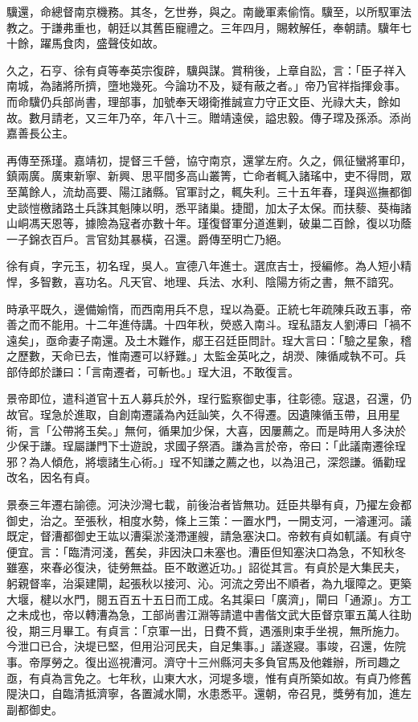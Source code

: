 \begin{pinyinscope}
驥還，命總督南京機務。其冬，乞世券，與之。南畿軍素偷惰。驥至，以所馭軍法教之。于謙弗重也，朝廷以其舊臣寵禮之。三年四月，賜敕解任，奉朝請。驥年七十餘，躍馬食肉，盛聲伎如故。

久之，石亨、徐有貞等奉英宗復辟，驥與謀。賞稍後，上章自訟，言：「臣子祥入南城，為諸將所擠，墮地幾死。今論功不及，疑有蔽之者。」帝乃官祥指揮僉事。而命驥仍兵部尚書，理部事，加號奉天翊衛推誠宣力守正文臣、光祿大夫，餘如故。數月請老，又三年乃卒，年八十三。贈靖遠侯，謚忠毅。傳子瑺及孫添。添尚嘉善長公主。

再傳至孫瑾。嘉靖初，提督三千營，協守南京，還掌左府。久之，佩征蠻將軍印，鎮兩廣。廣東新寧、新興、思平間多高山叢箐，亡命者輒入諸瑤中，吏不得問，眾至萬餘人，流劫高要、陽江諸縣。官軍討之，輒失利。三十五年春，瑾與巡撫都御史談愷檄諸路土兵誅其魁陳以明，悉平諸巢。捷聞，加太子太保。而扶藜、葵梅諸山峒馮天恩等，據險為寇者亦數十年。瑾復督軍分道進剿，破巢二百餘，復以功蔭一子錦衣百戶。言官劾其暴橫，召還。爵傳至明亡乃絕。

徐有貞，字元玉，初名珵，吳人。宣德八年進士。選庶吉士，授編修。為人短小精悍，多智數，喜功名。凡天官、地理、兵法、水利、陰陽方術之書，無不諳究。

時承平既久，邊備媮惰，而西南用兵不息，珵以為憂。正統七年疏陳兵政五事，帝善之而不能用。十二年進侍講。十四年秋，熒惑入南斗。珵私語友人劉溥曰「禍不遠矣」，亟命妻子南還。及土木難作，郕王召廷臣問計。珵大言曰：「驗之星象，稽之歷數，天命已去，惟南遷可以紓難。」太監金英叱之，胡濙、陳循咸執不可。兵部侍郎於謙曰：「言南遷者，可斬也。」珵大沮，不敢復言。

景帝即位，遣科道官十五人募兵於外，珵行監察御史事，往彰德。寇退，召還，仍故官。珵急於進取，自創南遷議為內廷訕笑，久不得遷。因遺陳循玉帶，且用星術，言「公帶將玉矣。」無何，循果加少保，大喜，因屢薦之。而是時用人多決於少保于謙。珵屬謙門下士遊說，求國子祭酒。謙為言於帝，帝曰：「此議南遷徐珵邪？為人傾危，將壞諸生心術。」珵不知謙之薦之也，以為沮己，深怨謙。循勸珵改名，因名有貞。

景泰三年遷右諭德。河決沙灣七載，前後治者皆無功。廷臣共舉有貞，乃擢左僉都御史，治之。至張秋，相度水勢，條上三策：一置水門，一開支河，一濬運河。議既定，督漕都御史王竑以漕渠淤淺滯運艘，請急塞決口。帝敕有貞如軏議。有貞守便宜。言：「臨清河淺，舊矣，非因決口未塞也。漕臣但知塞決口為急，不知秋冬雖塞，來春必復決，徒勞無益。臣不敢邀近功。」詔從其言。有貞於是大集民夫，躬親督率，治渠建閘，起張秋以接河、沁。河流之旁出不順者，為九堰障之。更築大堰，楗以水門，閱五百五十五日而工成。名其渠曰「廣濟」，閘曰「通源」。方工之未成也，帝以轉漕為急，工部尚書江淵等請遣中書偕文武大臣督京軍五萬人往助役，期三月畢工。有貞言：「京軍一出，日費不貲，遇漲則束手坐視，無所施力。今泄口已合，決堤已堅，但用沿河民夫，自足集事。」議遂寢。事竣，召還，佐院事。帝厚勞之。復出巡視漕河。濟守十三州縣河夫多負官馬及他雜辦，所司趣之亟，有貞為言免之。七年秋，山東大水，河堤多壞，惟有貞所築如故。有貞乃修舊隄決口，自臨清抵濟寧，各置減水閘，水患悉平。還朝，帝召見，獎勞有加，進左副都御史。


\end{pinyinscope}
